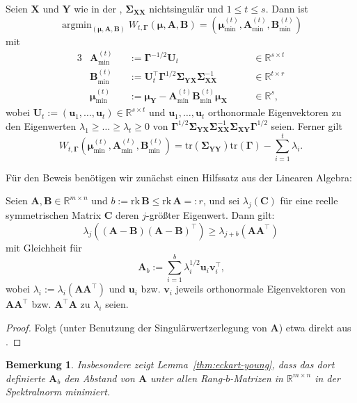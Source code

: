 \documentclass[]{article}
\newcommand{\R}{\mathbb{R}}
\newcommand{\X}{\mathbf{X}}
\newcommand{\Y}{\mathbf{Y}}
\newcommand{\muu}{\bm{\mu}}
\newcommand{\Ssigma}{\mathbf{\Sigma}}
\newcommand{\uu}{\mathbf{u}}
\newcommand{\C}{\mathbf{C}}
\newcommand{\rk}{\mathrm{rk}}
\newcommand{\A}{\mathbf{A}}
\newcommand{\B}{\mathbf{B}}
\newcommand{\Ggamma}{\mathbf{\Gamma}}
\newcommand{\tr}{\mathrm{tr}}
\newtheorem*{remark}{Bemerkung}
\DeclareMathOperator*{\argmin}{argmin}
\begin{document}
\begin{theorem}
	\label{thm:rrr}
	Seien $\X$ und $\Y$ wie in der , $\Ssigma_{\X\X}$ nichtsingulär und $1 \leq t \leq s$. Dann ist
	$$\argmin_{(\muu, \A, \B)} W_{t, \Ggamma}(\muu, \A, \B) = (\muu^{(t)}_{\min}, \A^{(t)}_{\min}, \B^{(t)}_{\min})$$ mit
	\begin{alignat*}{3}
		&\A^{(t)}_{\min}   &&:= \Ggamma^{-1/2} \mathbf{U}_t                                       &&\quad \in \R^{s \times t} \\
		&\B^{(t)}_{\min}   &&:= \mathbf{U}_t^\top \Ggamma^{1/2} \Ssigma_{\Y\X}\Ssigma_{\X\X}^{-1} &&\quad \in \R^{t \times r} \\
		&\muu^{(t)}_{\min} &&:= \muu_\Y - \A^{(t)}_{\min} \B^{(t)}_{\min} \muu_\X                 &&\quad \in \R^s \text{,}
	\end{alignat*}
	wobei $\mathbf{U}_t := (\uu_1,\dots, \uu_t) \in \R^{s \times t}$ und $\uu_1,\dots, \uu_t$ orthonormale Eigenvektoren zu den Eigenwerten $\lambda_1 \geq \dots \geq \lambda_t \geq 0$ von $\Ggamma^{1/2} \Ssigma_{\Y\X} \Ssigma_{\X\X}^{-1} \Ssigma_{\X\Y} \Ggamma^{1/2}$ seien.
	Ferner gilt
	$$W_{t, \Ggamma}(\muu^{(t)}_{\min}, \A^{(t)}_{\min}, \B^{(t)}_{\min}) = \tr(\Ssigma_{\Y\Y}) \tr(\Ggamma) - \sum_{i=1}^{t} \lambda_i \text{.}$$
\end{theorem}

Für den Beweis benötigen wir zunächst einen Hilfssatz aus der Linearen Algebra:

\begin{lemma}
	\label{thm:eckart-young}
	Seien $\A, \B \in \R^{m \times n}$ und $b := \rk \, \B \leq \rk \, \A =: r$, und sei
	$\lambda_j(\C)$ für eine reelle symmetrischen Matrix $\C$ deren $j$-größter Eigenwert.
	Dann gilt:
	$$\lambda_j((\A - \B)(\A - \B)^\top) \geq \lambda_{j+b}(\A \A^\top)$$
	mit Gleichheit für
	$$\A_b := \sum_{i=1}^{b} \lambda_i^{1/2} \mathbf{u}_i \mathbf{v}_i^\top \text{,}$$
	wobei $\lambda_i := \lambda_i(\A \A^\top)$ und $\mathbf{u}_i$ bzw. $\mathbf{v}_i$ jeweils orthonormale Eigenvektoren von $\A \A^\top$ bzw. 
	$\A^\top \A$ zu $\lambda_i$ seien.
\end{lemma}

\begin{proof}
	Folgt (unter Benutzung der Singulärwertzerlegung von $\A$) etwa direkt aus \cite[Satz 4.6]{BZ21}.
\end{proof}

\begin{remark}
	Insbesondere zeigt Lemma~\ref{thm:eckart-young}, dass das dort definierte $\A_b$ den Abstand von $\A$ unter allen Rang-$b$-Matrizen in $\R^{m \times n}$ in der Spektralnorm minimiert.
\end{remark}
\end{document}
